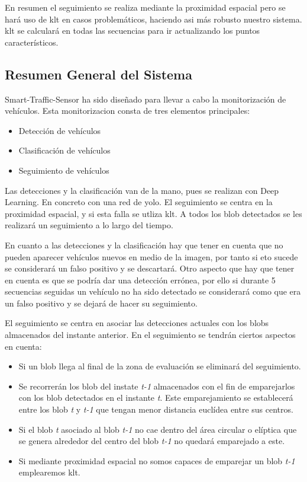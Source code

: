 En resumen el seguimiento se realiza mediante la proximidad espacial pero se hará uso de \acrshort{klt} en casos problemáticos, haciendo asi más robusto nuestro sistema. \acrshort{klt} se calculará en todas las secuencias para ir actualizando los puntos característicos.

\subsection{Resumen General del Sistema}

Smart-Traffic-Sensor ha sido diseñado para llevar a cabo la monitorización de vehículos.  Esta monitorizacion consta de tres elementos principales:

\begin{itemize}
    \item Detección de vehículos
    \item Clasificación de vehículos
    \item Seguimiento de vehículos
\end{itemize}

Las detecciones y la clasificación van de la mano, pues se realizan con Deep Learning. En concreto con una red de \acrshort{yolo}. El seguimiento se centra en la proximidad espacial, y si esta falla se utliza \acrshort{klt}. A todos los blob detectados se les realizará un seguimiento a lo largo del tiempo.

En cuanto a las detecciones y la clasificación hay que tener en cuenta que no pueden aparecer vehículos nuevos en medio de la imagen, por tanto si eto sucede se considerará un falso positivo y se descartará. Otro aspecto que hay que tener en cuenta es que se podría dar una detección errónea, por ello si durante 5 secuencias seguidas un vehículo no ha sido detectado se considerará como que era un falso positivo y se dejará de hacer su seguimiento.

El seguimiento se centra en asociar las detecciones actuales con los blobs almacenados del instante anterior. En el seguimiento se tendrán ciertos aspectos en cuenta:

\begin{itemize}
    \item Si un blob llega al final de la zona de evaluación se eliminará del seguimiento.
    \item Se recorrerán los blob del instate \textit{t-1} almacenados con el fin de emparejarlos con los blob detectados en el instante \textit{t}. Este emparejamiento se establecerá entre los blob \textit{t} y \textit{t-1} que tengan menor distancia euclídea entre sus centros.
    \item Si el blob \textit{t} asociado al blob \textit{t-1} no cae dentro del área circular o elíptica que se genera alrededor del centro del blob \textit{t-1} no quedará emparejado a este. 
    \item Si mediante proximidad espacial no somos capaces de emparejar un blob \textit{t-1} emplearemos \acrshort{klt}.
\end{itemize}

